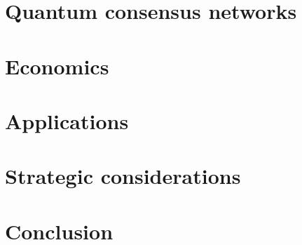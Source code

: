 \documentclass[twocolumn, aps, amsmath, amssymb, nofootinbib, superscriptaddress, longbibliography, floatfix, eqsecnum, rmp]{revtex4-2}
\begin{document}
\section{Quantum consensus networks} \label{sec:QCN}


\section{Economics} \label{sec:economics}


\section{Applications} \label{sec:applications}


\section{Strategic considerations} \label{sec:strategic_cons}


\section{Conclusion} \label{sec:conclusion}


\begin{acknowledgments}
%	
\end{acknowledgments}



\appendix
\end{document}
